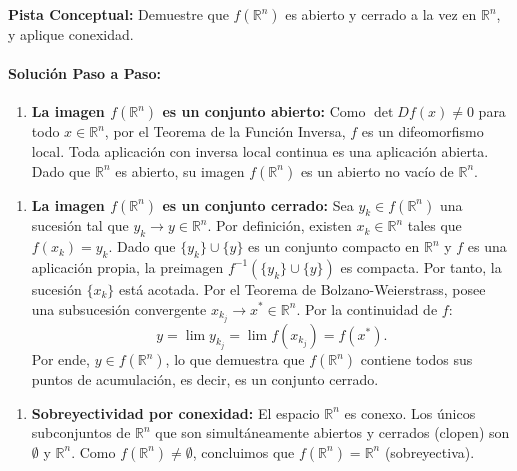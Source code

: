 \documentclass[11pt,a4paper]{article}
\begin{document}
\begin{tcolorbox}[colback=yellow!4,colframe=accentamber!70,arc=1mm,boxrule=0.5pt,left=3mm,right=3mm,top=1.5mm,bottom=1.5mm]
\textbf{Pista Conceptual:} Demuestre que $f(\mathbb{R}^n)$ es abierto y cerrado a la vez en $\mathbb{R}^n$, y aplique conexidad.
\end{tcolorbox}

\paragraph{Solución Paso a Paso:}\par
\begin{enumerate}[label=\textbf{\arabic*.}]
\item \textbf{La imagen $f(\mathbb{R}^n)$ es un conjunto abierto:}
Como $\det Df(x) \neq 0$ para todo $x \in \mathbb{R}^n$, por el Teorema de la Función Inversa, $f$ es un difeomorfismo local. Toda aplicación con inversa local continua es una aplicación abierta. Dado que $\mathbb{R}^n$ es abierto, su imagen $f(\mathbb{R}^n)$ es un abierto no vacío de $\mathbb{R}^n$.
\end{enumerate}

\begin{enumerate}[label=\textbf{\arabic*.}]
\item \textbf{La imagen $f(\mathbb{R}^n)$ es un conjunto cerrado:}
Sea $y_k \in f(\mathbb{R}^n)$ una sucesión tal que $y_k \to y \in \mathbb{R}^n$.
Por definición, existen $x_k \in \mathbb{R}^n$ tales que $f(x_k) = y_k$.
Dado que $\{y_k\} \cup \{y\}$ es un conjunto compacto en $\mathbb{R}^n$ y $f$ es una aplicación propia, la preimagen $f^{-1}(\{y_k\} \cup \{y\})$ es compacta.
Por tanto, la sucesión $\{x_k\}$ está acotada. Por el Teorema de Bolzano-Weierstrass, posee una subsucesión convergente $x_{k_j} \to x^* \in \mathbb{R}^n$.
Por la continuidad de $f$:
\begin{equation*}
y = \lim y_{k_j} = \lim f(x_{k_j}) = f(x^*).
\end{equation*}
Por ende, $y \in f(\mathbb{R}^n)$, lo que demuestra que $f(\mathbb{R}^n)$ contiene todos sus puntos de acumulación, es decir, es un conjunto cerrado.
\end{enumerate}

\begin{enumerate}[label=\textbf{\arabic*.}]
\item \textbf{Sobreyectividad por conexidad:}
El espacio $\mathbb{R}^n$ es conexo. Los únicos subconjuntos de $\mathbb{R}^n$ que son simultáneamente abiertos y cerrados (clopen) son $\emptyset$ y $\mathbb{R}^n$.
Como $f(\mathbb{R}^n) \neq \emptyset$, concluimos que $f(\mathbb{R}^n) = \mathbb{R}^n$ (sobreyectiva).
\end{enumerate}
\end{document}
